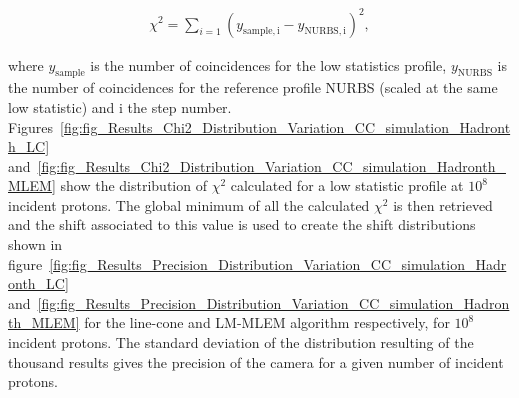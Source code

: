\begin{eqnarray}
\chi^2 = \sum\limits_{i=1} {(y_{\mathrm{sample,i}}-y_{\mathrm{NURBS,i}})^2},
\end{eqnarray}

where $y_{\mathrm{sample}}$ is the number of coincidences for the low statistics profile, $y_{\mathrm{NURBS}}$ is the number of coincidences for the reference profile NURBS (scaled at the same low statistic) and i the step number.\newline
Figures~\ref{fig:fig_Results_Chi2_Distribution_Variation_CC_simulation_Hadronth_LC} and~\ref{fig:fig_Results_Chi2_Distribution_Variation_CC_simulation_Hadronth_MLEM} show the distribution of $\chi^2$ calculated for a low statistic profile at $10^8$ incident protons.\newline
The global minimum of all the calculated $\chi^2$ is then retrieved and the shift associated to this value is used to create the shift distributions shown in figure~\ref{fig:fig_Results_Precision_Distribution_Variation_CC_simulation_Hadronth_LC} and~\ref{fig:fig_Results_Precision_Distribution_Variation_CC_simulation_Hadronth_MLEM} for the line-cone and LM-MLEM algorithm respectively, for $10^8$ incident protons. The standard deviation of the distribution resulting of the thousand results gives the precision of the camera for a given number of incident protons. 


